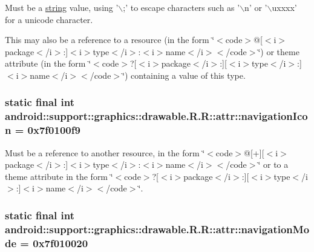 Must be a \hyperlink{classandroid_1_1support_1_1graphics_1_1drawable_1_1_r_1_1string}{string} value, using '$\backslash$;' to escape characters such as '$\backslash$n' or '$\backslash$uxxxx' for a unicode character. 

This may also be a reference to a resource (in the form \char`\"{}$<$code$>$@\mbox{[}$<$i$>$package$<$/i$>$:\mbox{]}$<$i$>$type$<$/i$>$:$<$i$>$name$<$/i$>$$<$/code$>$\char`\"{}) or theme attribute (in the form \char`\"{}$<$code$>$?\mbox{[}$<$i$>$package$<$/i$>$:\mbox{]}\mbox{[}$<$i$>$type$<$/i$>$:\mbox{]}$<$i$>$name$<$/i$>$$<$/code$>$\char`\"{}) containing a value of this type. \hypertarget{classandroid_1_1support_1_1graphics_1_1drawable_1_1_r_1_1attr_64e586c6cfc93c6cb1250ec3cda3166f}{
\subsubsection[{navigationIcon}]{\setlength{\rightskip}{0pt plus 5cm}static final int android::support::graphics::drawable.R.R::attr::navigationIcon = 0x7f0100f9}}
\label{classandroid_1_1support_1_1graphics_1_1drawable_1_1_r_1_1attr_64e586c6cfc93c6cb1250ec3cda3166f}


Must be a reference to another resource, in the form \char`\"{}$<$code$>$@\mbox{[}+\mbox{]}\mbox{[}$<$i$>$package$<$/i$>$:\mbox{]}$<$i$>$type$<$/i$>$:$<$i$>$name$<$/i$>$$<$/code$>$\char`\"{} or to a theme attribute in the form \char`\"{}$<$code$>$?\mbox{[}$<$i$>$package$<$/i$>$:\mbox{]}\mbox{[}$<$i$>$type$<$/i$>$:\mbox{]}$<$i$>$name$<$/i$>$$<$/code$>$\char`\"{}. \hypertarget{classandroid_1_1support_1_1graphics_1_1drawable_1_1_r_1_1attr_2687debde9d4ed0bd2624ffe98931683}{
\subsubsection[{navigationMode}]{\setlength{\rightskip}{0pt plus 5cm}static final int android::support::graphics::drawable.R.R::attr::navigationMode = 0x7f010020}}
\label{classandroid_1_1support_1_1graphics_1_1drawable_1_1_r_1_1attr_2687debde9d4ed0bd2624ffe98931683}


